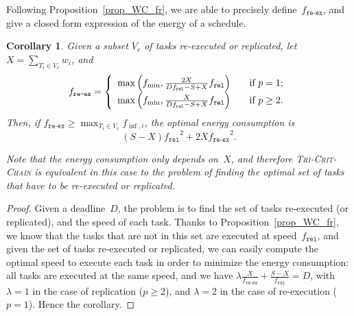 \documentclass[a4paper]{article}
\theoremstyle{plain}
\newtheorem{corollary}{Corollary}
\theoremstyle{definition}
\theoremstyle{remark}
\newcommand{\fmin}{\ensuremath{f_{\min}}\xspace}
\newcommand{\finf}{\ensuremath{f_{\inf,i}}\xspace}
\newcommand{\fr}{\ensuremath{f_{\texttt{rel}}}\xspace}
\newcommand{\freex}{\ensuremath{f_{\texttt{re-ex}}}\xspace}
\newcommand{\chain}{\textsc{Tri-Crit-Chain}\xspace}
\begin{document}
Following Proposition~\ref{prop_WC_fr}, we are able to precisely
define~\freex, and give a closed form expression of the energy of a
schedule. 
\begin{corollary}
  \label{cor.energy.chain}
Given a subset $V_r$ of tasks re-executed or replicated, let 
$X=\sum_{T_i\in V_r} w_i$, and 
\[
  \freex = \left\{
  \begin{array}{l l}
    \max\left(\fmin, \frac{2X}{D\fr-S+X}\fr\right) & \quad \text{if $p=1$};\\
    \max\left(\fmin, \frac{X}{D\fr-S+X}\fr\right) & \quad \text{if $p\geq 2$}.\\
  \end{array} \right. 
\]
Then, if $\freex\geq \max_{T_i\in V_r} \finf$,  
the optimal energy consumption is 
\begin{equation}
(S-X)\fr^2 + 2X \freex^2. 
\end{equation}

Note that the energy consumption only depends on~$X$, and therefore
\chain is equivalent in this case
to the problem of finding the optimal set of tasks that have to be
re-executed or replicated.
\end{corollary}

\begin{proof}
  Given a deadline~$D$, the problem is to find the set of tasks
  re-executed (or replicated), and the speed of each task. Thanks to
  Proposition~\ref{prop_WC_fr}, we know that the tasks that are not in
  this set are executed at speed~\fr, and given the set of tasks
  re-executed or replicated, we can easily compute the optimal speed
  to execute each task in order to minimize the energy consumption:
  all tasks are executed at the same speed, and we have
  $\lambda \frac{X}{\freex} + \frac{S-X}{\fr} = D$, with $\lambda=1$
  in the case of replication ($p\geq 2$), and $\lambda=2$ in the case
  of re-execution ($p=1$). 
  Hence the corollary.
\end{proof}
\end{document}
